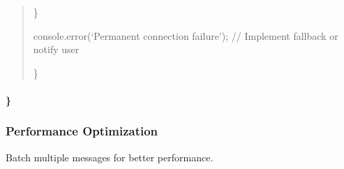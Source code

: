\documentclass[letterpaper,10pt,english]{sphinxmanual}
\begin{document}
\begin{quote}
\begin{description}
\end{description}

\sphinxAtStartPar
\}
\begin{description}
\sphinxAtStartPar
console.error(‘Permanent connection failure’);
// Implement fallback or notify user

\end{description}

\sphinxAtStartPar
\}
\end{quote}


\paragraph{\}}
\label{\detokenize{api/websocket-api:id130}}

\subsubsection{Performance Optimization}
\label{\detokenize{api/websocket-api:performance-optimization}}
\sphinxAtStartPar
Batch multiple messages for better performance.
\end{document}
